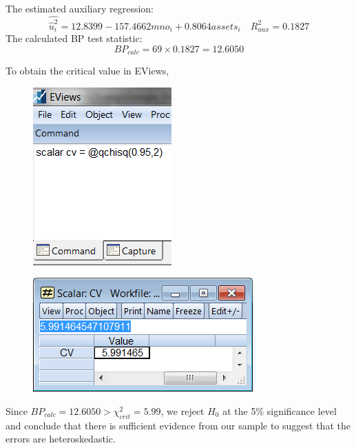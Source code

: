 \documentclass[12pt]{report}
\begin{document}
The estimated auxiliary regression: $$\widehat{\hat{u}^2_i} = 12.8399 - 157.4662 mno_i + 0.8064 assets_i \quad R^2_{aux} = 0.1827$$ The calculated BP test statistic:
$$BP_{calc} = 69 \times 0.1827 = 12.6050$$

\noindent To obtain the critical value in EViews,
\begin{figure}[H]
	\centering
	\includegraphics{tute10_2}
\end{figure}
\vspace{-\baselineskip}
\begin{figure}[H]
	\centering
	\includegraphics{tute10_3}
\end{figure}
\vspace{-\baselineskip}

\noindent Since $BP_{calc} = 12.6050 > \chi^2_{crit} = 5.99$, we reject $H_0$ at the 5\% significance level and conclude that there is sufficient evidence from our sample to suggest that the errors are heteroskedastic.
\end{document}

